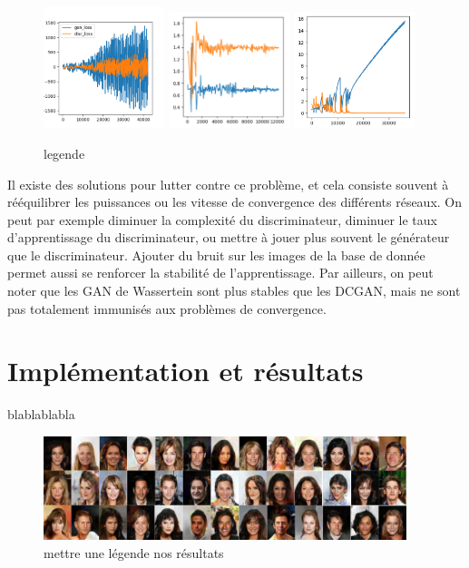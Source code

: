 \begin{figure}[!h]
\centering
\includegraphics[width=100pt]{"images/failure1"}
\includegraphics[width=100pt]{"images/failure2"}
\includegraphics[width=100pt]{"images/failure3"}
\caption{legende}
\end{figure}


Il existe des solutions pour lutter contre ce problème, et cela consiste souvent à rééquilibrer les puissances ou les vitesse de convergence des différents réseaux. On peut par exemple diminuer la complexité du discriminateur, diminuer le taux d'apprentissage du discriminateur, ou mettre à jouer plus souvent le générateur que le discriminateur.
Ajouter du bruit sur les images de la base de donnée permet aussi se renforcer la stabilité de l'apprentissage. Par ailleurs, on peut noter que les GAN de Wassertein sont plus stables que les DCGAN, mais ne sont pas totalement immunisés aux problèmes de convergence.


\section{Implémentation et résultats}

blablablabla

\begin{figure}[!h]
\centering
\includegraphics[width=300pt]{"images/DCGAN"}
\caption{mettre une légende nos résultats}
\end{figure}